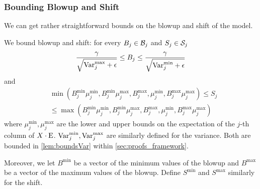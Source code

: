 

\subsubsection{Bounding Blowup and Shift}
We can get rather straightforward bounds on the blowup and shift of the model.
\begin{lemma}
	\label{lem:boundsBS}
	We bound blowup and shift: for every $B_j \in \mathcal{B}_j$ and $S_j \in \mathcal{S}_j$
	\[
		\frac{\gamma}{\sqrt{\mathrm{Var}_j^{\max} + \epsilon}} \leq B_j \leq \frac{\gamma}{\sqrt{\mathrm{Var}_j^{\min} + \epsilon}}
	\]
	and
	\begin{align*}
	&\min\left(B_j^{\min} \mu_j^{\min}, B_j^{\min} \mu_j^{\max}, B_j^{\max}, \mu_j^{\min}, B_j^{\max} \mu_j^{\max}\right)
	\leq
	S_j\\
	&\leq
	\max\left(B_j^{\min} \mu_j^{\min}, B_j^{\min} \mu_j^{\max}, B_j^{\max}, \mu_j^{\min}, B_j^{\max} \mu_j^{\max}\right)
	\end{align*}
	where $\mu^{\min}_j, \mu^{\max}_j$ are the lower and upper bounds on the expectation of the $j$-th column of $X \cdot \text{E}$. $\mathrm{Var}_j^{\min}, \mathrm{Var}_j^{\max}$ are similarly defined for the variance.
    Both are bounded in \cref{lem:boundsVar} within \cref{sec:proofs_framework}.
\end{lemma}
Moreover, we let $B^{\min}$ be a vector of the minimum values of the blowup and $B^{\max}$ be a vector of the maximum values of the blowup.
Define $S^{\min}$ and $S^{\max}$ similarly for the shift.

